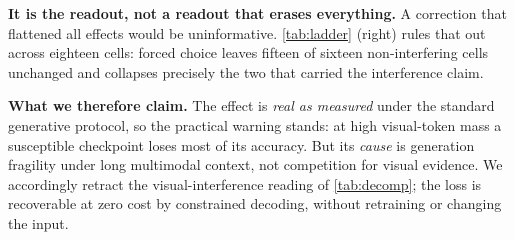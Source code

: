 \documentclass[10pt,twocolumn,letterpaper]{article}
\begin{document}
\noindent\textbf{It is the readout, not a readout that erases everything.} A correction that flattened all effects would be uninformative. \cref{tab:ladder} (right) rules that out across eighteen cells: forced choice leaves fifteen of sixteen non-interfering cells unchanged and collapses precisely the two that carried the interference claim.

\noindent\textbf{What we therefore claim.} The effect is \emph{real as measured} under the standard generative protocol, so the practical warning stands: at high visual-token mass a susceptible checkpoint loses most of its accuracy. But its \emph{cause} is generation fragility under long multimodal context, not competition for visual evidence. We accordingly retract the visual-interference reading of \cref{tab:decomp}; the loss is recoverable at zero cost by constrained decoding, without retraining or changing the input.
\end{document}
